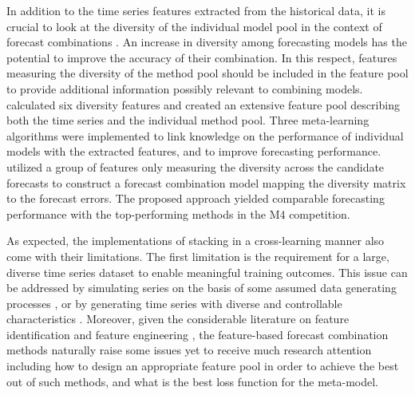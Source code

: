 \documentclass[a4paper,11pt]{article}
\newcommand{\pkg}[1]{{\normalfont\fontseries{b}\selectfont #1}}
\let\proglang=\textsf
\begin{document}
In addition to the time series features extracted from the historical data, it is crucial to look at the diversity of the individual model pool in the context of forecast combinations \citep{Batchelor1995-ps,Thomson2019-al,Atiya2020-ge,Lichtendahl2020-ut}. An increase in diversity among forecasting models has the potential to improve the accuracy of their combination. In this respect, features measuring the diversity of the method pool should be included in the feature pool to provide additional information possibly relevant to combining models. \citet{Lemke2010-wn} calculated six diversity features and created an extensive feature pool describing both the time series and the individual method pool. Three meta-learning algorithms were implemented to link knowledge on the performance of individual models with the extracted features, and to improve forecasting performance. \citet{Kang2021-ol} utilized a group of features only measuring the diversity across the candidate forecasts to construct a forecast combination model mapping the diversity matrix to the forecast errors. The proposed approach yielded comparable forecasting performance with the top-performing methods in the M4 competition.

As expected, the implementations of stacking in a cross-learning manner also come with their limitations. The first limitation is the requirement for a large, diverse time series dataset to enable meaningful training outcomes. This issue can be addressed by simulating series on the basis of some assumed data generating processes \citep{Talagala2018-meta} \citep[implemented using the \proglang{R} package \pkg{forecast},][]{rforecast}, or by generating time series with diverse and controllable characteristics \citep{Kang2020-rl} \citep[implemented in the \proglang{R} package \pkg{gratis},][]{rgratis}. Moreover, given the considerable literature on feature identification and feature engineering \citep[e.g.,][]{Wang2009-hs,Kang2017-wt,Lemke2010-wn,Montero-Manso2020-tq,Li2020-od}, the feature-based forecast combination methods naturally raise some issues yet to receive much research attention including how to design an appropriate feature pool in order to achieve the best out of such methods, and what is the best loss function for the meta-model.
\end{document}
